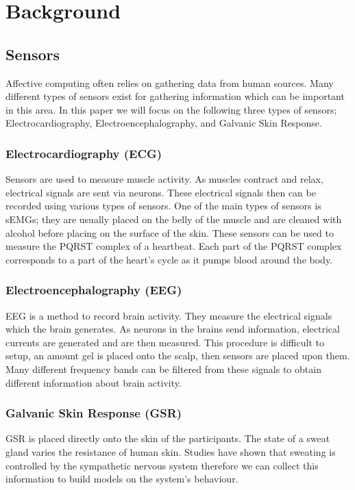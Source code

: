\section{Background}
\label{sec:background}
\subsection{Sensors}
Affective computing often relies on gathering data from human sources.
Many different types of sensors exist for
gathering information which can be important in this area.
In this paper we will focus on the following three types of sensors;
Electrocardiography,
Electroencephalography,
and Galvanic Skin Response.

\subsubsection{Electrocardiography (ECG)}
Sensors are used to measure muscle activity.
As muscles contract and relax,
electrical signals are sent via neurons.
These electrical signals then
can be recorded using various types of sensors.
One of the main types of sensors is sEMGs;
they are usually placed on the belly of the muscle
and are cleaned with alcohol before placing
on the surface of the skin.
These sensors can be used to measure
the PQRST complex of a heartbeat.
Each part of the PQRST complex
corresponds to a part of the heart's cycle as it pumps blood around the body.

\subsubsection{Electroencephalography (EEG)}
EEG is a method to record brain activity.
They measure the electrical signals which the brain generates.
As neurons in the brains send information,
electrical currents are generated and are then measured.
This procedure is difficult to setup,
an amount gel is placed onto the scalp, then sensors are placed upon them.
Many different frequency bands can be filtered from these
signals to obtain different information about brain activity.

\subsubsection{Galvanic Skin Response (GSR)}
GSR is placed directly onto the skin of the participants.
The state of a sweat gland varies the resistance of human skin.
Studies have shown that sweating is controlled by the sympathetic nervous system
therefore we can collect this information
to build models on the system's behaviour.

